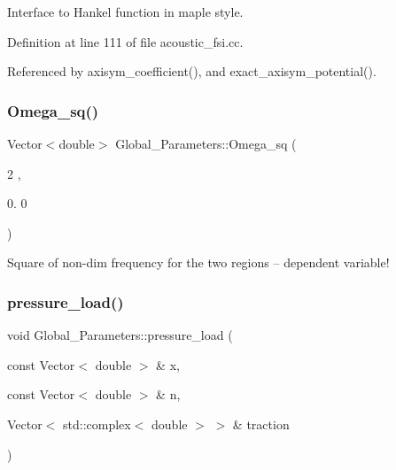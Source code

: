 Interface to Hankel function in maple style. 



Definition at line 111 of file acoustic\+\_\+fsi.\+cc.



Referenced by axisym\+\_\+coefficient(), and exact\+\_\+axisym\+\_\+potential().

\mbox{\label{namespaceGlobal__Parameters_a461bb148c1f6494672520bdf8045483f}} 
\subsubsection{\texorpdfstring{Omega\+\_\+sq()}{Omega\_sq()}}
{\footnotesize\ttfamily Vector$<$double$>$ Global\+\_\+\+Parameters\+::\+Omega\+\_\+sq (\begin{DoxyParamCaption}\item[{2}]{,  }\item[{0.}]{0 }\end{DoxyParamCaption})}



Square of non-\/dim frequency for the two regions -- dependent variable! 

\mbox{\label{namespaceGlobal__Parameters_a0ddb3a77481b907fbb34f2e8d0a6eb9f}} 
\subsubsection{\texorpdfstring{pressure\+\_\+load()}{pressure\_load()}}
{\footnotesize\ttfamily void Global\+\_\+\+Parameters\+::pressure\+\_\+load (\begin{DoxyParamCaption}\item[{const Vector$<$ double $>$ \&}]{x,  }\item[{const Vector$<$ double $>$ \&}]{n,  }\item[{Vector$<$ std\+::complex$<$ double $>$ $>$ \&}]{traction }\end{DoxyParamCaption})}



